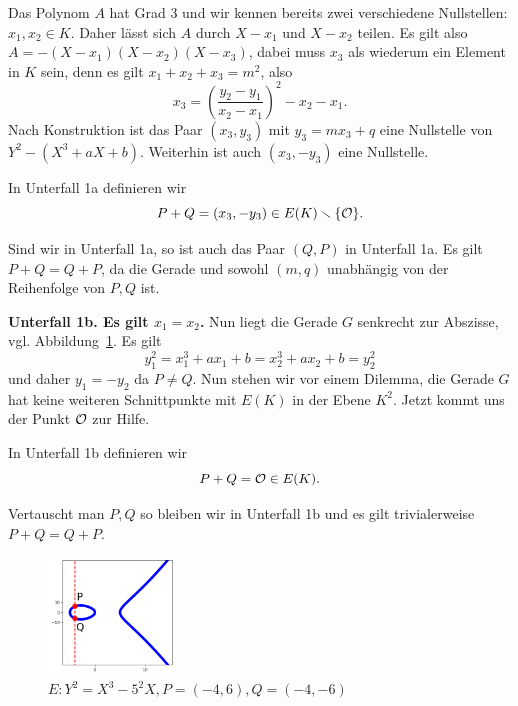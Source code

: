 Das Polynom $A$ hat Grad $3$  und wir kennen bereits zwei verschiedene
Nullstellen: $x_1,x_2\in K$. Daher lässt sich $A$ durch $X-x_1$ und
$X-x_2$ teilen. Es gilt also $A = -(X-x_1)(X-x_2)(X-x_3)$, dabei muss
$x_3$ als wiederum ein Element in $K$ sein, denn es gilt $x_1+x_2+x_3
= m^2$, also
\begin{equation*}
  x_3 = \left(\frac{y_2-y_1}{x_2-x_1}\right)^2-x_2-x_1.
\end{equation*}
Nach Konstruktion ist das Paar $(x_3,y_3)$ mit  $y_3=mx_3+q$ eine
Nullstelle von $Y^2-(X^3+aX+b)$. Weiterhin ist auch $(x_3,-y_3)$ eine
Nullstelle.

In Unterfall 1a definieren wir
\begin{equation*}
  P+Q = (x_3,-y_3) \in E(K)\smallsetminus \{{\mathcal O}\}.
\end{equation*}

Sind wir in  Unterfall 1a, so ist auch das Paar $(Q,P)$ in Unterfall
1a. Es gilt $P+Q=Q+P$, da die Gerade und sowohl $(m,q)$ unabhängig von
der Reihenfolge von $P,Q$ ist. 

\textbf{Unterfall 1b. Es gilt $x_1=x_2$.} Nun liegt die Gerade $G$
senkrecht zur Abszisse, vgl. Abbildung~\ref{fig:unterfall1b}. Es gilt
\begin{equation*}
  y_1^2 = x_1^3+a x_1 +b = x_2^3+a x_2 +b = y_2^2
\end{equation*}
und daher $y_1=-y_2$ da $P\not=Q$. Nun stehen wir vor einem
Dilemma, die Gerade $G$ hat keine weiteren Schnittpunkte mit $E(K)$ in
der Ebene $K^2$. Jetzt kommt uns der Punkt ${\mathcal O}$ zur Hilfe.

In Unterfall 1b definieren wir
\begin{equation*}
  P+Q = {\mathcal O} \in E(K).
\end{equation*}

Vertauscht man $P,Q$ so bleiben wir in Unterfall 1b und es gilt
trivialerweise $P+Q=Q+P$.  

\begin{figure}
  \centering    
  \caption{$E: Y^2 = X^3-5^2 X,P = (-4,6),Q = (-4,-6)$}
  \label{fig:unterfall1b}
  \includegraphics[width=0.3\textwidth]{./plots/unterfall1b.png}
\end{figure}

